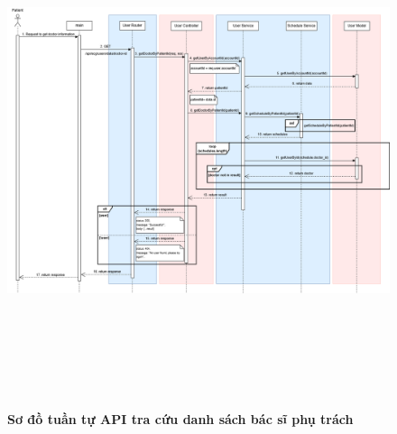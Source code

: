\begin{figure}[H]
	\centering
	\includegraphics[width=15cm,height=15cm]{Images/api_sequence/user/getDoctorByPatientId.drawio.png}
	\caption[Sơ đồ tuần tự API tra cứu danh sách bác sĩ phụ trách]{\bfseries \fontsize{12pt}{0pt}\selectfont Sơ đồ tuần tự API tra cứu danh sách bác sĩ phụ trách}
	\label{sequence_diagram_get_doctor_data}
\end{figure}

